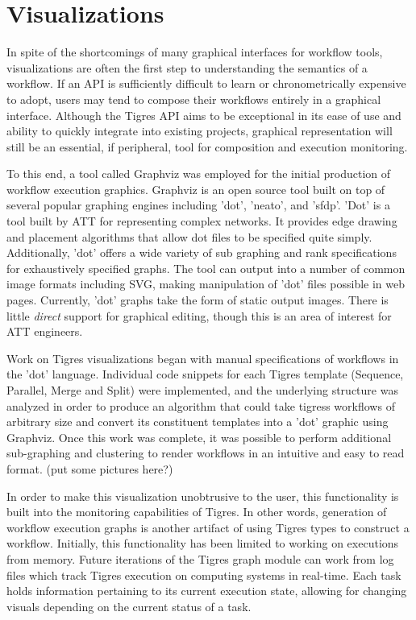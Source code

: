 \section{Visualizations}

In spite of the shortcomings of many graphical interfaces for workflow tools, visualizations are often the first step to understanding the semantics of a workflow. If an API is sufficiently difficult to learn or chronometrically expensive to adopt, users may tend to compose their workflows entirely in a graphical interface. Although the Tigres API aims to be exceptional in its ease of use and ability to quickly integrate into existing projects, graphical representation will still be an essential, if peripheral, tool for composition and execution monitoring.

To this end, a tool called Graphviz was employed for the initial production of workflow execution graphics. Graphviz is an open source tool built on top of several popular graphing engines including 'dot', 'neato', and 'sfdp'. 'Dot' is a tool built by ATT for representing complex networks. It provides edge drawing and placement algorithms that allow dot files to be specified quite simply. Additionally, 'dot' offers a wide variety of sub graphing and rank specifications for exhaustively specified graphs. The tool can output into a number of common image formats including SVG, making manipulation of 'dot' files possible in web pages. Currently, 'dot' graphs take the form of static output images. There is little {\em direct} support for graphical editing, though this is an area of interest for ATT engineers. 

Work on Tigres visualizations began with manual specifications of workflows in the 'dot' language. Individual code snippets for each Tigres template (Sequence, Parallel, Merge and Split) were implemented, and the underlying structure was analyzed in order to produce an algorithm that could take tigress workflows of arbitrary size and convert its constituent templates into a 'dot' graphic using Graphviz. Once this work was complete, it was possible to perform additional sub-graphing and clustering to render workflows in an intuitive and easy to read format. (put some pictures here?)

In order to make this visualization unobtrusive to the user, this functionality is built into the monitoring capabilities of Tigres. In other words, generation of workflow execution graphs is another artifact of using Tigres types to construct a workflow. Initially, this functionality has been limited to working on executions from memory. Future iterations of the Tigres graph module can work from log files which track Tigres execution on computing systems in real-time. Each task holds information pertaining to its current execution state, allowing for changing visuals depending on the current status of a task. 

